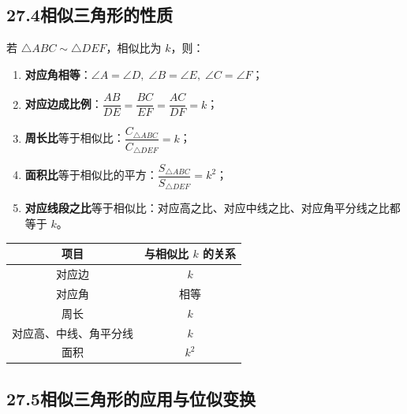 \documentclass[12pt, a4paper]{ctexart}
\begin{document}
\subsection*{27.4\quad 相似三角形的性质}

\begin{knowledgebox}[相似三角形的性质]
若 $\triangle ABC\sim\triangle DEF$，相似比为 $k$，则：
\begin{enumerate}[nosep]
  \item \textbf{对应角相等}：$\angle A=\angle D,\;\angle B=\angle E,\;\angle C=\angle F$；
  \item \textbf{对应边成比例}：$\dfrac{AB}{DE}=\dfrac{BC}{EF}=\dfrac{AC}{DF}=k$；
  \item \textbf{周长比}等于相似比：$\dfrac{C_{\triangle ABC}}{C_{\triangle DEF}}=k$；
  \item \textbf{面积比}等于相似比的平方：$\dfrac{S_{\triangle ABC}}{S_{\triangle DEF}}=k^2$；
  \item \textbf{对应线段之比}等于相似比：对应高之比、对应中线之比、对应角平分线之比都等于 $k$。
\end{enumerate}
\end{knowledgebox}

\begin{tipbox}[规律总结]
\begin{center}
\begin{tabular}{|c|c|}
\hline
\textbf{项目} & \textbf{与相似比 $k$ 的关系} \\
\hline
对应边 & $k$ \\
\hline
对应角 & 相等 \\
\hline
周长 & $k$ \\
\hline
对应高、中线、角平分线 & $k$ \\
\hline
面积 & $k^2$ \\
\hline
\end{tabular}
\end{center}
\end{tipbox}

\subsection*{27.5\quad 相似三角形的应用与位似变换}
\end{document}
